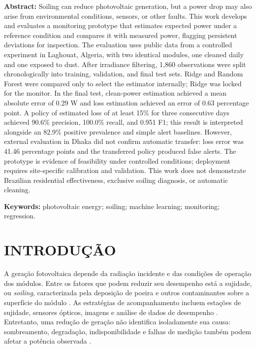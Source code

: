 \documentclass{UNESC}
\begin{document}
\vspace{0.8em}
\noindent\textbf{Abstract:} Soiling can reduce photovoltaic generation, but a power drop may also arise from environmental conditions, sensors, or other faults. This work develops and evaluates a monitoring prototype that estimates expected power under a reference condition and compares it with measured power, flagging persistent deviations for inspection. The evaluation uses public data from a controlled experiment in Laghouat, Algeria, with two identical modules, one cleaned daily and one exposed to dust. After irradiance filtering, 1,860 observations were split chronologically into training, validation, and final test sets. Ridge and Random Forest were compared only to select the estimator internally; Ridge was locked for the monitor. In the final test, clean-power estimation achieved a mean absolute error of 0.29 W and loss estimation achieved an error of 0.63 percentage point. A policy of estimated loss of at least 15\% for three consecutive days achieved 90.6\% precision, 100.0\% recall, and 0.951 F1; this result is interpreted alongside an 82.9\% positive prevalence and simple alert baselines. However, external evaluation in Dhaka did not confirm automatic transfer: loss error was 41.46 percentage points and the transferred policy produced false alerts. The prototype is evidence of feasibility under controlled conditions; deployment requires site-specific calibration and validation. This work does not demonstrate Brazilian residential effectiveness, exclusive soiling diagnosis, or automatic cleaning.

\vspace{0.5em}
\noindent\textbf{Keywords:} photovoltaic energy; soiling; machine learning; monitoring; regression.

\section{INTRODUÇÃO}

A geração fotovoltaica depende da radiação incidente e das condições de operação dos módulos. Entre os fatores que podem reduzir seu desempenho está a sujidade, ou \textit{soiling}, caracterizada pela deposição de poeira e outros contaminantes sobre a superfície do módulo \cite{king2004,bessa2021}. As estratégias de acompanhamento incluem estações de sujidade, sensores ópticos, imagens e análise de dados de desempenho \cite{bessa2021}. Entretanto, uma redução de geração não identifica isoladamente sua causa: sombreamento, degradação, indisponibilidade e falhas de medição também podem afetar a potência observada \cite{skomedal2020}.
\end{document}
